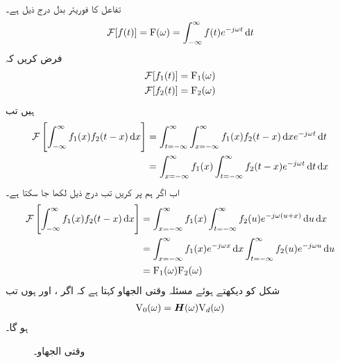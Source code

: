 تفاعل  کا فوریئر بدل درج ذیل ہے۔
\begin{align}
\Fourier[f(t)]=\bF(\omega)=\int_{-\infty}^{\infty}f(t) e^{-j\omega t} \dif t
\end{align}
فرض کریں کہ 
\begin{align*}
\mathcal{F}[f_1(t)]&={{\textup{F}}}_1(\omega)\\
\mathcal{F}[f_2(t)]&={{\textup{F}}}_2(\omega)
\end{align*}
ہیں تب
\begin{align*}
\Fourier\left[\int_{-\infty}^{\infty}f_1(x)f_2(t-x)\dif x\right]&=\int_{t=-\infty}^{\infty}\int_{x=-\infty}^{\infty}f_1(x)f_2(t-x)\dif x  e^{-j\omega t}\dif t\\
&=\int_{x=-\infty}^{\infty}f_1(x)\int_{t=-\infty}^{\infty}f_2(t-x)  e^{-j\omega t}\dif t \dif x
\end{align*}
اب  اگر ہم  پر کریں  تب درج ذیل لکھا جا سکتا ہے۔
\begin{align*}
\Fourier\left[\int_{-\infty}^{\infty}f_1(x)f_2(t-x)\dif x\right]&=\int_{x=-\infty}^{\infty}f_1(x)\int_{t=-\infty}^{\infty}f_2(u)  e^{-j\omega (u+x)}\dif u \dif x\\
&=\int_{x=-\infty}^{\infty}f_1(x) e^{-j\omega x}\dif x \int_{t=-\infty}^{\infty}f_2(u)  e^{-j\omega u}\dif u \\
&=\bF_1(\omega) \bF_2(\omega)
\end{align*}
شکل  کو دیکھتے ہوئے مسئلہ وقتی الجھاو کہتا ہے کہ اگر ،
  اور  ہوں تب
\begin{align}\label{مساوات_فوریئر_حل_دور}
{\ensuremath{{\textup{V}}}}_0(\omega)={{\boldsymbol{H}}}(\omega) {{\textup{V}}}_d(\omega)
\end{align}
ہو گا۔
\begin{figure}
\centering
{}
\caption{وقتی الجھاو۔}
\label{شکل_فوریئر_وقتی_الجھاو}
\end{figure}
